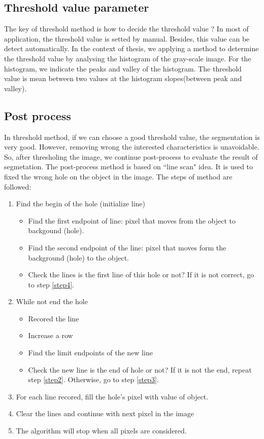 \subsection{Threshold value parameter}
The key of threshold method is how to decide the threshold value ? In most of application, the threshold value is setted by manual. Besides, this value can be detect automatically. In the context of thesis, we applying a method to determine the threshold value by analysing the histogram of the gray-scale image. For the histogram, we indicate the peaks and valley of the histogram. The threshold value is mean between two values at the histogram slopes(between peak and valley).
\subsection{Post process}
In threshold method, if we can choose a good threshold value, the segmentation is very good. However, removing  wrong the interested characteristics is unavoidable. So, after thresholing the image, we continue post-process to evaluate the result of segmetation. The post-process method is based on ``line scan" idea. It is used to fixed the wrong hole on the object in the image. The steps of method are followed:
\begin{enumerate}
	\item Find the begin of the hole (initialize line)
		\begin{itemize}
			\item Find the first endpoint of line: pixel that moves from the object to backgound (hole).
			\item Find the second endpoint of the line: pixel that moves form the background (hole) to the object.
			\item Check the lines is the first line of this hole or not? If it is not correct, go to step \ref{step4}.
		\end{itemize}
	\item \label{step2}While not end the hole
		\begin{itemize}
			\item Recored the line
			\item Increase a row
			\item Find the limit endpoints of the new line
			\item Check the new line is the end of hole or not? If it is not the end, repeat step \ref{step2}. Otherwise, go to step \ref{step3}.
		\end{itemize}
	\item \label{step3}For each line recored, fill the hole's pixel with value of object.
	\item \label{step4}Clear the lines and continue with next pixel in the image
	\item The algorithm will stop when all pixels are considered.
\end{enumerate}
